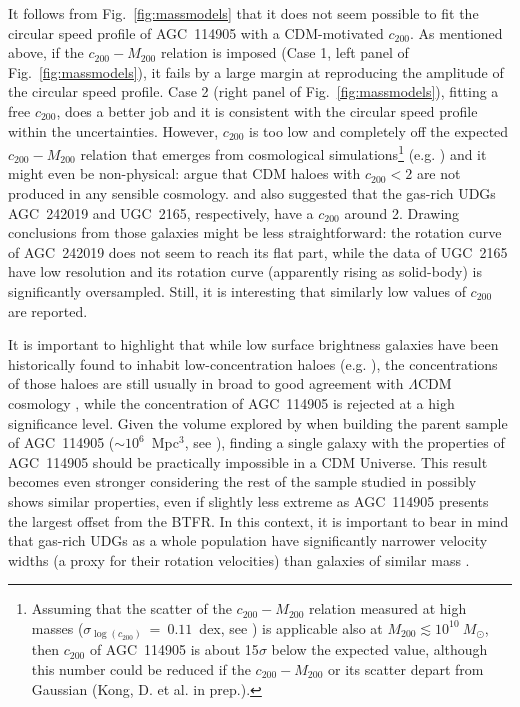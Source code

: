 \documentclass[fleqn,usenatbib]{mnras}
\begin{document}
It follows from Fig.~\ref{fig:massmodels} that it does not seem possible to fit the circular speed profile of AGC~114905 with a CDM-motivated $c_{200}$. As mentioned above, if the $c_{200}-M_{200}$ relation is imposed (Case 1, left panel of Fig.~\ref{fig:massmodels}), it fails by a large margin at reproducing the amplitude of the circular speed profile. Case 2 (right panel of Fig.~\ref{fig:massmodels}), fitting a free $c_{200}$, does a better job and it is consistent with the circular speed profile within the uncertainties. However, $c_{200}$ is too low and completely off the expected $c_{200}-M_{200}$ relation that emerges from cosmological simulations\footnote{Assuming that the scatter of the $c_{200}-M_{200}$ relation measured at high masses ($\sigma_{\log(c_{200})}~=~0.11$~dex, see \citealt{duttonmaccio2014})  is applicable also at $M_{200} \lesssim 10^{10}~M_\odot$, then $c_{200}$ of AGC~114905 is about 15$\sigma$ below the expected value, although this number could be reduced if the $c_{200}-M_{200}$ or its scatter depart from Gaussian (Kong, D. et al. in prep.).} (e.g. \citealt{duttonmaccio2014,ludlow2014}) and it might even be non-physical: \citet{mcgaugh2003} argue that CDM haloes with $c_{200} < 2$ are not produced in any sensible cosmology. \citet{sengupta2019} and \citet{shi2021} also suggested that the gas-rich UDGs AGC~242019 and UGC~2165, respectively, have a $c_{200}$ around 2. Drawing conclusions from those galaxies might be less straightforward: the rotation curve of AGC~242019 does not seem to reach its flat part, while the data of UGC~2165 have low resolution and its rotation curve (apparently rising as solid-body) is significantly oversampled. Still, it is interesting that similarly low values of $c_{200}$ are reported. 

It is important to highlight that while low surface brightness galaxies have been historically found to inhabit low-concentration haloes (e.g. \citealt{mcgaugh2003}), the concentrations of those haloes are still usually in broad to good agreement with $\Lambda$CDM cosmology \citep{maccio2007}, while the concentration of AGC~114905 is rejected at a high significance level. Given the volume explored by \citet{leisman2017} when building the parent sample of AGC~114905 ($\sim 10^6$~Mpc$^3$, see \citealt{alfalfa,jones_huds}), finding a single galaxy with the properties of AGC~114905 should be practically impossible in a CDM Universe. This result becomes even stronger considering the rest of the sample studied in \citet{huds2019,huds2020} possibly shows similar properties, even if slightly less extreme as AGC~114905 presents the largest offset from the BTFR. In this context, it is important to bear in mind that gas-rich UDGs as a whole population have significantly narrower velocity widths (a proxy for their rotation velocities) than galaxies of similar mass \citep{leisman2017,jones_huds}.
\end{document}
